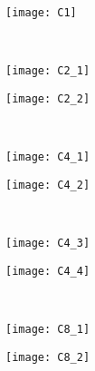 \newpage
\begin{figure}[H]
\centering
\begin{minipage}[t]{0.49\textwidth}
	\centering
		\texttt{[image: C1]}
	\end{minipage} \\ \vspace{.25cm} 
	\begin{minipage}[b]{0.49\textwidth}
		\texttt{[image: C2\_1]}
	\end{minipage} \hfill
	\begin{minipage}[b]{0.49\textwidth}
		\texttt{[image: C2\_2]}
	\end{minipage} \\ \vspace{.25cm} 
	\begin{minipage}[b]{0.49\textwidth}
		\texttt{[image: C4\_1]}
	\end{minipage} \hfill
	\begin{minipage}[b][3.1cm]{0.49\textwidth}
		\texttt{[image: C4\_2]}
	\end{minipage} \\ \vspace{-.5cm} 
	\begin{minipage}[b]{0.49\textwidth}
		\texttt{[image: C4\_3]}
	\end{minipage} \hfill
	\begin{minipage}[b][5.1cm]{0.49\textwidth}
		\texttt{[image: C4\_4]}
	\end{minipage} \\ \vspace{-1.9cm} 
	\begin{minipage}[b]{0.49\textwidth}
		\texttt{[image: C8\_1]}
	\end{minipage} \hfill
	\begin{minipage}[b][5.1cm]{0.49\textwidth}
		\texttt{[image: C8\_2]}
	\end{minipage} \\	\vspace{.5cm} 

\end{figure}
